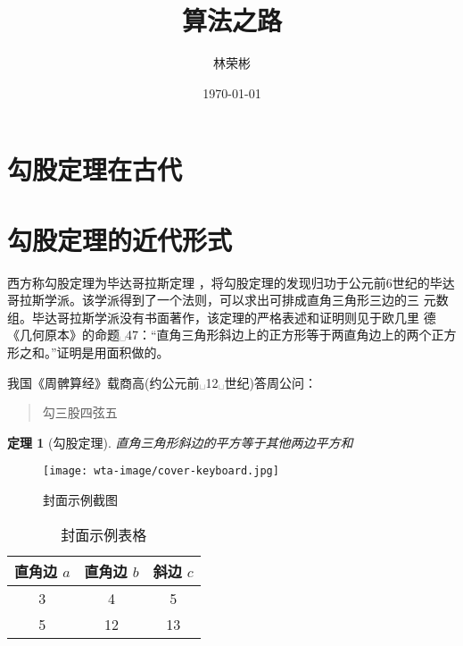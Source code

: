 \documentclass[UTF8]{ctexart}
\title{算法之路}
\author{林荣彬}
\date{\today}
\newtheorem{theorem}{定理}
\begin{document}
\maketitle
\tableofcontents
\section{勾股定理在古代}
\section{勾股定理的近代形式}

西方称勾股定理为毕达哥拉斯定理 \cite{IntroductionToAlgorithms}，将勾股定理的发现归功于公元前6世纪的毕达哥拉斯学派。该学派得到了一个法则，可以求出可排成直角三角形三边的三 元数组。毕达哥拉斯学派没有书面著作，该定理的严格表述和证明则见于欧几里 德《几何原本》的命题␣47：``直角三角形斜边上的正方形等于两直角边上的两个正方形之和。''证明是用面积做的。

我国《周髀算经》载商高(约公元前␣12␣世纪)答周公问：
\begin{quote}
    勾三股四弦五
\end{quote}

\begin{theorem}[勾股定理]
    直角三角形斜边的平方等于其他两边平方和
\end{theorem}

\begin{figure}[ht]
    \centering
    \texttt{[image: wta-image/cover-keyboard.jpg]}
    \caption{封面示例截图}
    \label{fig:xiantu}
\end{figure}

\begin{table}[htbp]
    \centering
    \begin{tabular}{|ccc|}
        \hline
        直角边 $a$  &  直角边 $b$  &  斜边 $c$  \\
        \hline
        3 & 4 & 5   \\
        5 & 12 & 13 \\
        \hline
    \end{tabular}
    \caption{封面示例表格}
\end{table}


\end{document}
